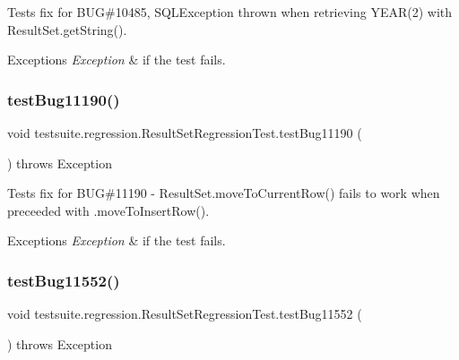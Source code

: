 Tests fix for B\+UG\#10485, S\+Q\+L\+Exception thrown when retrieving Y\+E\+A\+R(2) with Result\+Set.\+get\+String().


\begin{DoxyExceptions}{Exceptions}
{\em Exception} & if the test fails. \\
\hline
\end{DoxyExceptions}
\mbox{\label{classtestsuite_1_1regression_1_1_result_set_regression_test_aeb922ab7f293e6e7184ea654eb06a00a}} 
\subsubsection{\texorpdfstring{test\+Bug11190()}{testBug11190()}}
{\footnotesize\ttfamily void testsuite.\+regression.\+Result\+Set\+Regression\+Test.\+test\+Bug11190 (\begin{DoxyParamCaption}{ }\end{DoxyParamCaption}) throws Exception}

Tests fix for B\+UG\#11190 -\/ Result\+Set.\+move\+To\+Current\+Row() fails to work when preceeded with .move\+To\+Insert\+Row().


\begin{DoxyExceptions}{Exceptions}
{\em Exception} & if the test fails. \\
\hline
\end{DoxyExceptions}
\mbox{\label{classtestsuite_1_1regression_1_1_result_set_regression_test_a51f2936ac4b4712e95e6a70490704482}} 
\subsubsection{\texorpdfstring{test\+Bug11552()}{testBug11552()}}
{\footnotesize\ttfamily void testsuite.\+regression.\+Result\+Set\+Regression\+Test.\+test\+Bug11552 (\begin{DoxyParamCaption}{ }\end{DoxyParamCaption}) throws Exception}

